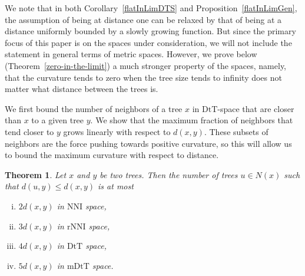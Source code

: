 \documentclass{amsart}
\newtheorem{theorem}[lemma]{Theorem}
\newcommand{\dts}{\mathrm{DtT}}
\newcommand{\nni}{\mathrm{NNI}}
\newcommand{\rnni}{\mathrm{rNNI}}
\newcommand{\mdts}{\mathrm{mDtT}}
\begin{document}
We note that in both Corollary~\ref{flatInLimDTS} and Proposition~\ref{flatInLimGen}, the assumption of being at distance one can be relaxed by that of being at a distance uniformly bounded by a slowly growing function.
But since the primary focus of this paper is on the spaces under consideration, we will not  include the statement in general terms of metric spaces.
However, we prove below (Theorem~\ref{zero-in-the-limit}) a much stronger property of the spaces, namely, that the curvature tends to zero when the tree size tends to infinity does not matter what distance between the trees is.

We first bound the number of neighbors of a tree $x$ in $\dts$-space that are closer than $x$ to a given tree $y$.
We show that the maximum fraction of neighbors that tend closer to $y$ grows linearly with respect to $d(x,y)$.
These subsets of neighbors are the force pushing towards positive curvature, so this will allow us to bound the maximum curvature with respect to distance.

\begin{theorem}
\label{max_good_neighbors}
Let $x$ and $y$ be two trees.
Then the number of trees $u \in N(x)$ such that $d(u, y) \le d(x, y)$ is at most 
\begin{enumerate}[(i)]
\item $2d(x,y)$ in $\nni$ space,
\item $3d(x,y)$ in $\rnni$ space,
\item $4d(x,y)$ in $\dts$ space,
\item $5d(x,y)$ in $\mdts$ space.
\end{enumerate}
\end{theorem}
\end{document}

